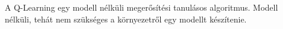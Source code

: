 A Q-Learning egy modell nélküli megerősítési tanulásos algoritmus. Modell nélküli, tehát nem szükséges a környezetről
egy modellt készítenie. 